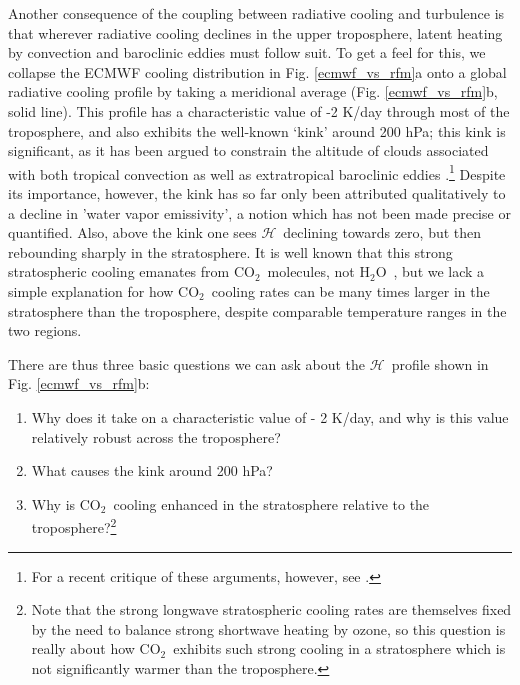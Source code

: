 \documentclass{ametsoc}
\newcommand{\cotwo}{\ensuremath{\mathrm{CO_2}}}
\newcommand{\htwo}{\ensuremath{\mathrm{H_2O}}}
\newcommand{\ch}{\ensuremath{\mathcal{H}}}
\begin{document}
Another consequence of the coupling between radiative cooling and turbulence is that wherever radiative cooling declines in the upper troposphere, latent heating by convection and baroclinic eddies must follow suit. To get a feel for this, we collapse the ECMWF cooling distribution in Fig. \ref{ecmwf_vs_rfm}a onto a global radiative cooling profile by taking a meridional average (Fig. \ref{ecmwf_vs_rfm}b, solid line). This profile has a characteristic value of -2 K/day through most of the troposphere, and also exhibits the well-known `kink' around 200 hPa; this kink is significant, as it has been argued to constrain  the altitude of clouds associated with both tropical convection \citep[i.e. the FAT hypothesis,][]{hartmann2002,hartmann2001} as well as extratropical baroclinic eddies \citep{thompson2017}.\footnote{For a recent critique of these arguments, however, see  \cite{seeley2019b}.}
 Despite its importance, however, the kink has so far only been attributed qualitatively to a decline in 'water vapor emissivity', a notion which has not been made precise or quantified. Also, above the kink one sees \ch\  declining towards zero, but then rebounding sharply in the stratosphere. It is well known that this strong stratospheric cooling emanates from  \cotwo\ molecules, not \htwo\  \citep[e.g][]{zhu1992, manabe1964}, but we lack a simple explanation for how \cotwo\ cooling rates can be many times larger in the stratosphere than the troposphere, despite comparable temperature ranges in the two regions.  %

There are thus three basic questions we can ask about the \ch\ profile shown in Fig. \ref{ecmwf_vs_rfm}b:
\begin{enumerate}
	\item \label{Q2k} Why does it take on a characteristic value of - 2 K/day, and why is this value relatively robust across  the troposphere?
	\item \label{Qkink} What causes the kink around 200 hPa?
	\item \label{Qstrat} Why is \cotwo\ cooling enhanced in the stratosphere relative to the troposphere?\footnote{Note that the strong longwave stratospheric cooling rates  are themselves fixed by the need to balance strong shortwave heating by ozone, so this question is really about how \cotwo\ exhibits such strong cooling in a stratosphere  which is not significantly warmer than the troposphere.}
\end{enumerate}
\end{document}
